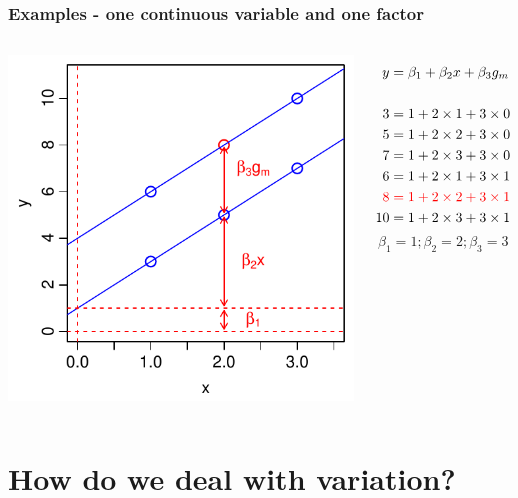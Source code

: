 \documentclass[aspectratio=43]{beamer}
\begin{document}
\frame
{\frametitle{Examples - one continuous variable and one factor}

\begin{columns}[T]

		\includegraphics[width=\textwidth]{TwoVarsHighlight.pdf}
		
			\begin{align*}
			  y  &= \beta_1  + \beta_2 x + \beta_3 g_m\\
			  \\
			  3   & = 1 + 2 \times 1 + 3 \times 0\\
			  5   & = 1 + 2 \times 2 + 3 \times 0\\
			  7   & = 1 + 2 \times 3 + 3 \times 0\\
			  6   & = 1 + 2 \times 1 + 3 \times 1\\  
			  {\color{red}8} & {\color{red}\;= 1 + 2 \times 2 + 3 \times 1}\\ %
			  10  & = 1 + 2 \times 3 + 3 \times 1
			\end{align*}
	        \[\beta_1 = 1; \beta_2=2; \beta_3=3\]
\end{columns}
}

\section{How do we deal with variation?}
\end{document}
